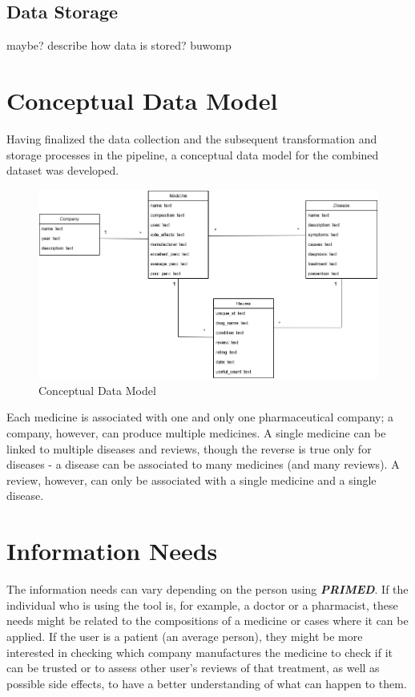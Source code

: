 \documentclass[sigconf]{acmart}
\begin{document}
\subsection{Data Storage}

maybe? describe how data is stored? buwomp

\section{Conceptual Data Model}

Having finalized the data collection and the subsequent transformation and storage processes in the pipeline, a conceptual data model for the combined dataset was developed.

\begin{figure}[H]
  \centering
  \includegraphics[width=\linewidth]{pri_uml_final.png}
  \caption{Conceptual Data Model}
  \label{fig:uml}
\end{figure}

Each medicine is associated with one and only one pharmaceutical company; a company, however, can produce multiple medicines. A single medicine can be linked to multiple diseases and reviews, though the reverse is true only for diseases - a disease can be associated to many medicines (and many reviews). A review, however, can only be associated with a single medicine and a single disease.

\section{Information Needs}

The information needs can vary depending on the person using \textit{\textbf{PRIMED}}. If the individual who is using the tool is, for example, a doctor or a pharmacist, these needs might be related to the compositions of a medicine or cases where it can be applied. If the user is a patient (an average person), they might be more interested in checking which company manufactures the medicine to check if it can be trusted or to assess other user's reviews of that treatment, as well as possible side effects, to have a better understanding of what can happen to them.
\end{document}

